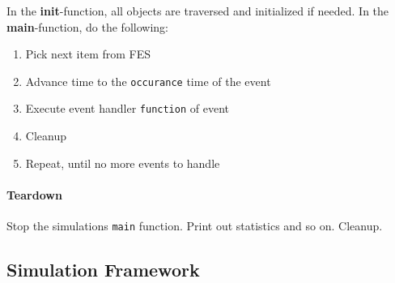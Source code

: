 \documentclass[english]{panikzettel}
\begin{document}
	In the  \textbf{init}-function, all objects are traversed and initialized if needed.
	In the \textbf{main}-function, do the following:
	\begin{enumerate}
		\item Pick next item from FES
		\item Advance time to the \texttt{occurance} time of the event
		\item Execute event handler  \texttt{function} of event
		\item Cleanup
		\item Repeat, until no more events to handle
	\end{enumerate}

	\paragraph{Teardown}
	\label{pgf:framework:teardown}

	Stop the simulations \texttt{main} function.
	Print out statistics and so on.
	Cleanup.
	
	\subsection{Simulation Framework}
	\label{ss:discrete-event-simulation:simulation-framework}
	
	
	
		
	

		
		
		
			
			
			
	
	
	
	
	
				
\end{document}
